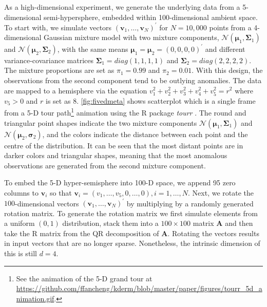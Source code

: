 \documentclass[11pt,a4paper,]{article}
\begin{document}
As a high-dimensional experiment, we generate the underlying data from a 5-dimensional semi-hypersphere, embedded within 100-dimensional ambient space. To start with, we simulate vectors \((\pmb{v}_1, \dots, \pmb{v}_N)^\prime\) for \(N=10,000\) points from a 4-dimensional Gaussian mixture model with two mixture components, \(\mathcal{N}(\pmb{\mu}_1, \pmb{\Sigma}_1)\) and \(\mathcal{N}(\pmb{\mu}_2, \pmb{\Sigma}_2)\), with the same means \(\pmb{\mu}_1 = \pmb{\mu}_2 =(0, 0, 0, 0)^\prime\) and different variance-covariance matrices \(\pmb{\Sigma}_1 = diag(1,1,1,1)\) and \(\pmb{\Sigma}_2 = diag(2,2,2,2)\). The mixture proportions are set as \(\pi_1=0.99\) and \(\pi_2=0.01\). With this design, the observations from the second component tend to be outlying anomalies. The data are mapped to a hemisphere via the equation
\(v_1^2 + v_2^2 + v_3^2 + v_4^2 + v_5^2 = r^2\) where \(v_5>0\) and \(r\) is set as \(8\).
\autoref{fig:fivedmeta} shows scatterplot which is a single frame from a 5-D tour path\footnote{See the animation of the 5-D grand tour at \url{https://github.com/ffancheng/kderm/blob/master/paper/figures/tourr_5d_animation.gif}.} animation using the R package \emph{tourr} \autocite{Wickham2011-ir}. The round and triangular point shapes indicate the two mixture components \(\mathcal{N}(\pmb{\mu}_1, \pmb{\Sigma}_1)\) and
\(\mathcal{N}(\pmb{\mu}_2, \pmb{\sigma}_2)\), and the colors indicate the distance between each point and the centre of the distribution. It can be seen that the most distant points are in darker colors and triangular shapes, meaning that the most anomalous observations are generated from the second mixture component.

To embed the 5-D hyper-semisphere into 100-D space, we append 95 zero columns to \(\pmb{v}_i\) so that \(\pmb{v}_i=(v_1, \dots, v_5, 0, \dots, 0), i=1,\dots,N\). Next, we rotate the \(100\)-dimensional vectors \((\pmb{v}_1, \dots, \pmb{v}_N)^\prime\) by multiplying by a randomly generated rotation matrix. To generate the rotation matrix we first simulate elements from a uniform \((0,1)\) distribution, stack them into a \(100\times 100\) matrix \(\pmb{A}\) and then take the R matrix from the QR decomposition of \(\pmb{A}\). Rotating the vectors results in input vectors that are no longer sparse. Nonetheless, the intrinsic dimension of this is still \(d=4\).
\end{document}
